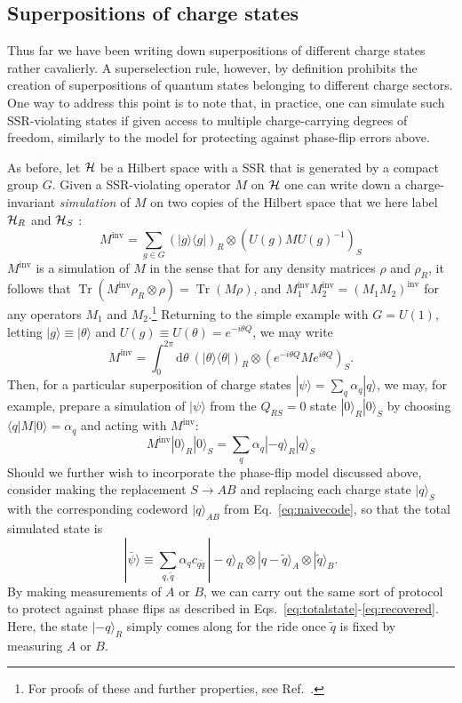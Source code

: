 \documentclass[11pt,english]{article}
\newcommand{\Eq}[1]{Eq.~\eqref{#1}}
\DeclareMathOperator{\Tr}{Tr}
\newcommand{\bra}[1]{\langle #1|}
\newcommand{\ket}[1]{|#1\rangle}
\newcommand{\ketbra}[2]{| #1 \rangle \langle #2 |}
\newcommand{\Hil}{{\cal H}}
\newcommand{\dee}{\mathrm{d}}
\begin{document}
\subsection{Superpositions of charge states}
\label{sec:charge-superpos}

Thus far we have been writing down superpositions of different charge states rather cavalierly.
A superselection rule, however, by definition prohibits the creation of superpositions of quantum states belonging to different charge sectors.
One way to address this point is to note that, in practice, one can simulate such SSR-violating states if given access to multiple charge-carrying degrees of freedom, similarly to the model for protecting against phase-flip errors above.

As before, let $\Hil$ be a Hilbert space with a SSR that is generated by a compact group $G$.
Given a SSR-violating operator $M$ on $\Hil$ one can write down a charge-invariant \emph{simulation} of $M$ on two copies of the Hilbert space that we here label $\Hil_R$ and $\Hil_S$ \cite{Kitaev:2003zj}:
\begin{equation}
    M^\text{inv} = \sum_{g \in G} (\ketbra{g}{g})_R \otimes (U(g) M U(g)^{-1})_S
\end{equation}
$M^\text{inv}$ is a simulation of $M$ in the sense that for any density matrices $\rho$ and $\rho_R$, it follows that $\Tr(M^\text{inv} \rho_R \otimes \rho) = \Tr(M \rho)$, and $M_1^\text{inv} M_2^\text{inv} = (M_1 M_2)^\text{inv}$ for any operators $M_1$ and $M_2$.\footnote{For proofs of these and further properties, see Ref.~\cite{Kitaev:2003zj}.}
Returning to the simple example with $G = U(1)$, letting $\ket{g} \equiv \ket{\theta}$ and $U(g) \equiv U(\theta) = e^{-i\theta Q}$, we may write
\begin{equation}
    M^\text{inv} = \int_0^{2\pi} \dee \theta ~ (\ketbra{\theta}{\theta})_R \otimes (e^{-i \theta Q} M e^{i \theta Q})_S.
\end{equation}
Then, for a particular superposition of charge states $\ket{\psi} = \sum_q \alpha_q \ket{q}$, we may, for example, prepare a simulation of $\ket{\psi}$ from the $Q_{RS} = 0$ state $\ket{0}_R \ket{0}_S$ by choosing $\bra{q} M \ket{0} = \alpha_q$ and acting with $M^\text{inv}$:
\begin{equation}
    M^\text{inv} \ket{0}_R \ket{0}_S = \sum_q \alpha_q \ket{-q}_R \ket{q}_S
\end{equation}
Should we further wish to incorporate the phase-flip model discussed above, consider making the replacement $S \rightarrow AB$ and replacing each charge state $\ket{q}_S$ with the corresponding codeword $\ket{q}_{AB}$ from \Eq{eq:naivecode}, so that the total simulated state is
\begin{equation} \label{eq:finalRAB}
    \ket{\bar \psi} \equiv \sum_{q,\tilde{q}} \alpha_q c_{q\tilde{q}} \, \ket{-q}_R \otimes \ket{q-\tilde q}_A \otimes \ket{\tilde q}_B.
\end{equation}
By making measurements of $A$ or $B$, we can carry out the same sort of protocol to protect against phase flips as described in Eqs.~\eqref{eq:totalstate}-\eqref{eq:recovered}.
Here, the state $\ket{-q}_R$ simply comes along for the ride once $\tilde q$ is fixed by measuring $A$ or $B$.
\end{document}
